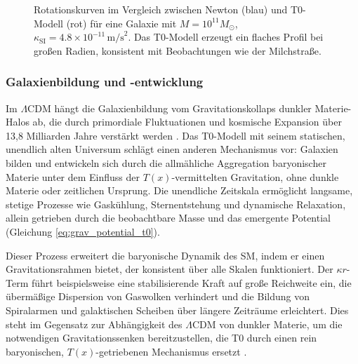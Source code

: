 \documentclass[12pt,a4paper]{article}
\newcommand{\Tfield}{T(x)}
\begin{document}
	\begin{figure}[h]
		\centering
		\caption{Rotationskurven im Vergleich zwischen Newton (blau) und T0-Modell (rot) für eine Galaxie mit \(M = 10^{11} M_{\odot}\), \(\kappa_{\text{SI}} = 4.8 \times 10^{-11} \, \text{m/s}^2\). Das T0-Modell erzeugt ein flaches Profil bei großen Radien, konsistent mit Beobachtungen wie der Milchstraße.}
		\label{fig:rotation_curves}
	\end{figure}
	
	\subsubsection{Galaxienbildung und -entwicklung}
	Im \(\Lambda\)CDM hängt die Galaxienbildung vom Gravitationskollaps dunkler Materie-Halos ab, die durch primordiale Fluktuationen und kosmische Expansion über 13,8 Milliarden Jahre verstärkt werden \cite{Planck2020}. Das T0-Modell mit seinem statischen, unendlich alten Universum schlägt einen anderen Mechanismus vor: Galaxien bilden und entwickeln sich durch die allmähliche Aggregation baryonischer Materie unter dem Einfluss der \(\Tfield\)-vermittelten Gravitation, ohne dunkle Materie oder zeitlichen Ursprung. Die unendliche Zeitskala ermöglicht langsame, stetige Prozesse wie Gaskühlung, Sternentstehung und dynamische Relaxation, allein getrieben durch die beobachtbare Masse und das emergente Potential (Gleichung \ref{eq:grav_potential_t0}).
	
	Dieser Prozess erweitert die baryonische Dynamik des SM, indem er einen Gravitationsrahmen bietet, der konsistent über alle Skalen funktioniert. Der \(\kappa r\)-Term führt beispielsweise eine stabilisierende Kraft auf große Reichweite ein, die übermäßige Dispersion von Gaswolken verhindert und die Bildung von Spiralarmen und galaktischen Scheiben über längere Zeiträume erleichtert. Dies steht im Gegensatz zur Abhängigkeit des \(\Lambda\)CDM von dunkler Materie, um die notwendigen Gravitationssenken bereitzustellen, die T0 durch einen rein baryonischen, \(\Tfield\)-getriebenen Mechanismus ersetzt \cite{pascher_galaxies_2025}.
	
\end{document}
